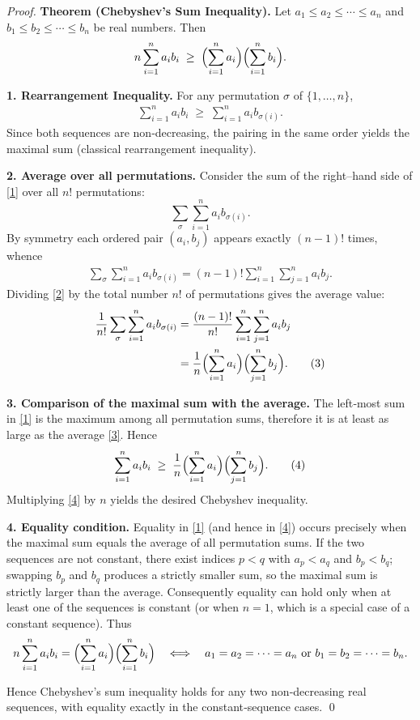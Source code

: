 \begin{proof}
\textbf{Theorem (Chebyshev’s Sum Inequality).}
Let $a_{1}\le a_{2}\le\cdots\le a_{n}$ and $b_{1}\le b_{2}\le\cdots\le b_{n}$ be real numbers. Then
\[
n\sum_{i=1}^{n}a_{i}b_{i}\;\ge\;\Bigl(\sum_{i=1}^{n}a_{i}\Bigr)\Bigl(\sum_{i=1}^{n}b_{i}\Bigr).
\]

\medskip
\textbf{1. Rearrangement Inequality.}
For any permutation $\sigma$ of $\{1,\dots,n\}$,
\begin{align*}
\sum_{i=1}^{n}a_{i}b_{i}\;\ge\;\sum_{i=1}^{n}a_{i}b_{\sigma(i)}. \tag{1}
\end{align*}
Since both sequences are non‑decreasing, the pairing in the same order yields the maximal sum (classical rearrangement inequality).

\medskip
\textbf{2. Average over all permutations.}
Consider the sum of the right–hand side of \eqref{1} over all $n!$ permutations:
\[
\sum_{\sigma}\sum_{i=1}^{n}a_{i}b_{\sigma(i)} .
\]
By symmetry each ordered pair $(a_{i},b_{j})$ appears exactly $(n-1)!$ times, whence
\begin{align*}
\sum_{\sigma}\sum_{i=1}^{n}a_{i}b_{\sigma(i)}
   =(n-1)!\sum_{i=1}^{n}\sum_{j=1}^{n}a_{i}b_{j}. \tag{2}
\end{align*}
Dividing \eqref{2} by the total number $n!$ of permutations gives the average value:
\begin{align*}
\frac{1}{n!}\sum_{\sigma}\sum_{i=1}^{n}a_{i}b_{\sigma(i)}
   &=\frac{(n-1)!}{n!}\sum_{i=1}^{n}\sum_{j=1}^{n}a_{i}b_{j} \\
   &=\frac{1}{n}\Bigl(\sum_{i=1}^{n}a_{i}\Bigr)\Bigl(\sum_{j=1}^{n}b_{j}\Bigr). \tag{3}
\end{align*}

\medskip
\textbf{3. Comparison of the maximal sum with the average.}
The left‑most sum in \eqref{1} is the maximum among all permutation sums, therefore it is at least as large as the average \eqref{3}. Hence
\begin{align*}
\sum_{i=1}^{n}a_{i}b_{i}
   \;\ge\;
   \frac{1}{n}\Bigl(\sum_{i=1}^{n}a_{i}\Bigr)\Bigl(\sum_{j=1}^{n}b_{j}\Bigr). \tag{4}
\end{align*}
Multiplying \eqref{4} by $n$ yields the desired Chebyshev inequality.

\medskip
\textbf{4. Equality condition.}
Equality in \eqref{1} (and hence in \eqref{4}) occurs precisely when the maximal sum equals the average of all permutation sums.  
If the two sequences are not constant, there exist indices $p<q$ with $a_{p}<a_{q}$ and $b_{p}<b_{q}$; swapping $b_{p}$ and $b_{q}$ produces a strictly smaller sum, so the maximal sum is strictly larger than the average. Consequently equality can hold only when at least one of the sequences is constant (or when $n=1$, which is a special case of a constant sequence). Thus
\[
n\sum_{i=1}^{n}a_{i}b_{i}
   =\Bigl(\sum_{i=1}^{n}a_{i}\Bigr)\Bigl(\sum_{i=1}^{n}b_{i}\Bigr)
   \quad\Longleftrightarrow\quad
   a_{1}=a_{2}=\dots =a_{n}\ \text{or}\ b_{1}=b_{2}=\dots =b_{n}.
\]

\medskip
Hence Chebyshev’s sum inequality holds for any two non‑decreasing real sequences, with equality exactly in the constant‑sequence cases. \qed
\end{proof}